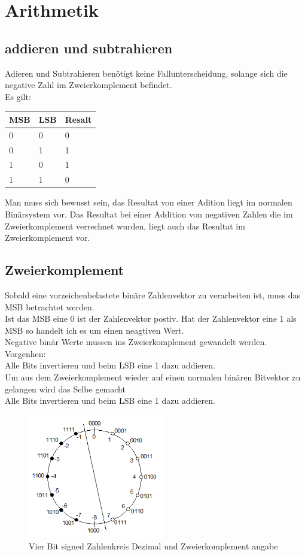 \section{Arithmetik}
\subsection{addieren und subtrahieren}
Adieren und Subtrahieren benötigt keine Fallunterscheidung, solange sich die 
negative Zahl im Zweierkomplement befindet.\\
Es gilt:\\
\begin{table}[h]
\begin{tabular}{ll|l}

MSB & LSB & Resalt \\ \hline
0   & 0   & 0      \\ 
0   & 1   & 1      \\ 
1   & 0   & 1      \\ 
1   & 1   & 0      \\ 
\end{tabular}
\end{table}

\noindent Man muss sich bewusst sein, das Resultat von einer Adition liegt im 
normalen Binärsystem vor. Das Resultat bei einer Addition von negativen Zahlen 
die im Zweierkomplement verrechnet wurden, liegt auch das Resultat im 
Zweierkomplement vor.

\subsection{Zweierkomplement}
Sobald eine vorzeichenbelastete binäre Zahlenvektor zu verarbeiten ist, muss 
das MSB betrachtet werden.\\
Ist das MSB eine 0 ist der Zahlenvektor postiv. Hat der Zahlenvektor eine 1 
als MSB so handelt ich es um einen neagtiven Wert.
\\
Negative binär Werte mussen ins Zweierkomplement gewandelt werden.\\
Vorgenhen:\\
Alle Bits invertieren und beim LSB eine 1 dazu addieren.
\\
Um aus dem Zweierkomplement wieder auf einen normalen binären Bitvektor zu 
gelangen wird das Selbe gemacht\\
Alle Bits invertieren und beim LSB eine 1 dazu addieren.
\begin{figure}[htbp]
	\centering
		\includegraphics[width=6cm]{content/bilder/Zahlenkreis.png}
	\caption{Vier Bit signed Zahlenkreis Dezimal und Zweierkomplement angabe}%
	\label{Zahlenkreis}
\end{figure}

